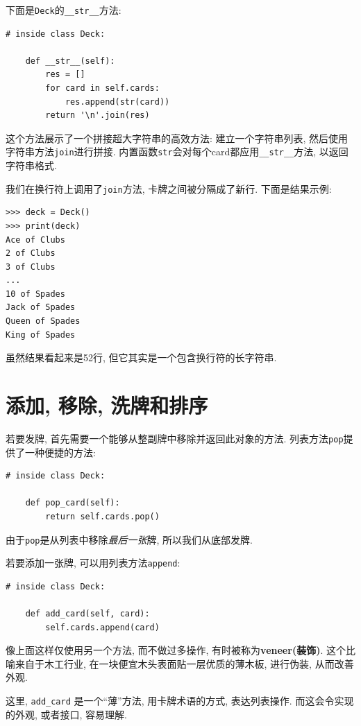 \documentclass[10pt]{book}
\begin{document}
下面是{\tt Deck}的\verb"__str__"方法:

\begin{verbatim}
# inside class Deck:

    def __str__(self):
        res = []
        for card in self.cards:
            res.append(str(card))
        return '\n'.join(res)
\end{verbatim}
%
这个方法展示了一个拼接超大字符串的高效方法: 建立一个字符串列表, 然后使用字符串方法{\tt join}进行拼接. 
内置函数{\tt str}会对每个card都应用\verb"__str__"方法, 以返回字符串格式.
 
  

我们在换行符上调用了{\tt join}方法, 卡牌之间被分隔成了新行. 
下面是结果示例:

\begin{verbatim}
>>> deck = Deck()
>>> print(deck)
Ace of Clubs
2 of Clubs
3 of Clubs
...
10 of Spades
Jack of Spades
Queen of Spades
King of Spades
\end{verbatim}
%
虽然结果看起来是52行, 但它其实是一个包含换行符的长字符串. 


\section{添加, 移除, 洗牌和排序}

若要发牌, 首先需要一个能够从整副牌中移除并返回此对象的方法. 
列表方法{\tt pop}提供了一种便捷的方法:

\begin{verbatim}
# inside class Deck:

    def pop_card(self):
        return self.cards.pop()
\end{verbatim}
%
由于{\tt pop}是从列表中移除{\em 最后一张}牌, 所以我们从底部发牌. 

若要添加一张牌, 可以用列表方法{\tt append}:

\begin{verbatim}
# inside class Deck:

    def add_card(self, card):
        self.cards.append(card)
\end{verbatim}
%
像上面这样仅使用另一个方法, 而不做过多操作, 有时被称为{\bf veneer(装饰)}. 
这个比喻来自于木工行业, 在一块便宜木头表面贴一层优质的薄木板, 进行伪装, 
从而改善外观. 

这里, \verb"add_card" 是一个``薄''方法, 用卡牌术语的方式, 表达列表操作. 
而这会令实现的外观, 或者接口, 容易理解. 
\end{document}
